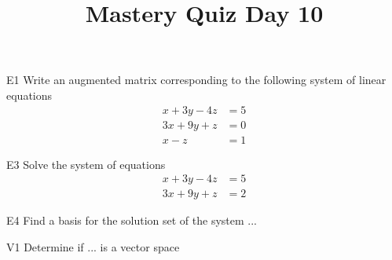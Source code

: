 \documentclass{sbgLAquiz}
\title{Mastery Quiz Day 10 }
\begin{document}
\begin{problem}{E1}
Write an augmented matrix corresponding to the following system of linear equations
\begin{align*}
x+3y-4z &= 5 \\
3x+9y+z &= 0 \\
x-z &= 1
\end{align*}
\end{problem}

\begin{problem}{E3}
Solve the system of equations
\begin{align*}
x+3y-4z &= 5 \\
3x+9y+z &= 2
\end{align*}
\end{problem}
\newpage

\begin{problem}{E4}
Find a basis for the solution set of the system ...
\end{problem}

\begin{problem}{V1}
Determine if ... is a vector space
\end{problem}
\end{document}
